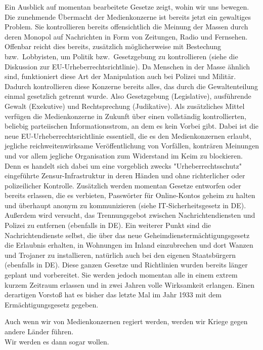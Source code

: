 \documentclass[a4paper,8pt]{extarticle}
\begin{document}
Ein Ausblick auf momentan bearbeitete Gesetze zeigt, wohin wir uns bewegen. Die zunehmende Übermacht der Medienkonzerne ist bereits jetzt ein gewaltiges Problem. Sie kontrollieren bereits offensichtlich die Meinung der Massen durch deren Monopol auf Nachrichten in Form von Zeitungen, Radio und Fernsehen. Offenbar reicht dies bereits, zusätzlich möglicherweise mit Bestechung bzw.\ Lobbyisten, um Politik bzw.\ Gesetzgebung zu kontrollieren (siehe die Diskussion zur EU-Urheberrechtsrichtlinie). Da Menschen in der Masse ähnlich sind, funktioniert diese Art der Manipulation auch bei Polizei und Militär. Dadurch kontrollieren diese Konzerne bereits alles, das durch die Gewaltenteilung einmal gesetzlich getrennt wurde. Also Gesetzgebung (Legislative), ausführende Gewalt (Exekutive) und Rechtsprechung (Judikative). Als zusätzliches Mittel verfügen die Medienkonzerne in Zukunft über einen vollständig kontrollierten, beliebig parteiischen Informationsstrom, an dem es kein Vorbei gibt. Dabei ist die neue EU-Urheberrechtsrichtlinie essentiell, die es den Medienkonzernen erlaubt, jegliche reichweitenwirksame Veröffentlichung von Vorfällen, konträren Meinungen und vor allem jegliche Organisation zum Widerstand im Keim zu blockieren. Denn es handelt sich dabei um eine vorgeblich zwecks "Urheberrechtsschutz" eingeführte Zensur-Infrastruktur in deren Händen und ohne richterlicher oder polizeilicher Kontrolle. Zusätzlich werden momentan Gesetze entworfen oder bereits erlassen, die es verbieten, Passwörter für Online-Kontos geheim zu halten und überhaupt anonym zu kommunizieren (siehe IT-Sicherheitsgesetz in DE). Außerdem wird versucht, das Trennungsgebot zwischen Nachrichtendiensten und Polizei zu entfernen (ebenfalls in DE). Ein weiterer Punkt sind die Nachrichtendienste selbst, die über das neue Geheimdienstermächtigungsgesetz die Erlaubnis erhalten, in Wohnungen im Inland einzubrechen und dort Wanzen und Trojaner zu installieren, natürlich auch bei den eigenen Staatsbürgern (ebenfalls in DE). Diese ganzen Gesetze und Richtlinien wurden bereits länger geplant und vorbereitet. Sie werden jedoch momentan alle in einem extrem kurzem Zeitraum erlassen und in zwei Jahren volle Wirksamkeit erlangen. Einen derartigen Vorstoß hat es bisher das letzte Mal im Jahr 1933 mit dem Ermächtigungsgesetz gegeben.

Auch wenn wir von Medienkonzernen regiert werden, werden wir Kriege gegen andere Länder führen.\\
Wir werden es dann sogar wollen.


\pagebreak
\setlength{\parskip}{0.5\baselineskip}
\end{document}
